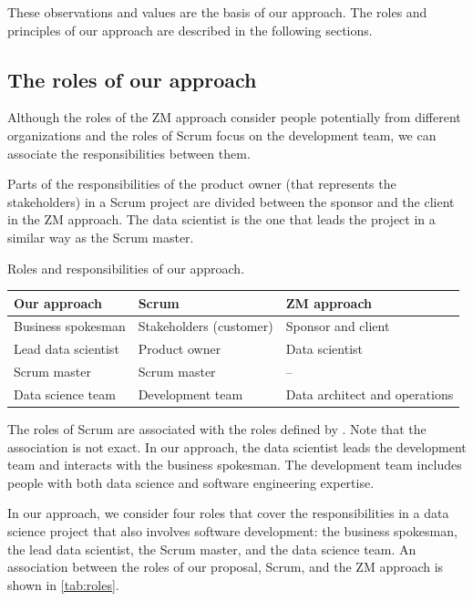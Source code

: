 These observations and values are the basis of our approach.  The roles and principles of
our approach are described in the following sections.

\subsection{The roles of our approach}

Although the roles of the ZM approach consider people potentially from different
organizations and the roles of Scrum focus on the development team, we can associate the
responsibilities between them.

Parts of the responsibilities of the product owner (that represents the stakeholders) in a
Scrum project are divided between the sponsor and the client in the ZM approach.  The data
scientist is the one that leads the project in a similar way as the Scrum master.

\begin{tablebox}[label=tab:roles]{Roles and responsibilities of our approach.}
  \centering
  \begin{tabular}{>{\raggedright\arraybackslash}p{2.5cm}>{\raggedright\arraybackslash}p{2.5cm}>{\raggedright\arraybackslash}p{2.5cm}}
    \toprule
    \textbf{Our approach} & \textbf{Scrum} & \textbf{ZM approach} \\
    \midrule
    Business spokesman    & Stakeholders (customer) & Sponsor and client \\
    Lead data scientist   & Product owner           & Data scientist \\
    Scrum master          & Scrum master            & -- \\
    Data science team     & Development team        & Data architect and operations \\
    \bottomrule
  \end{tabular}
  \tcblower
  The roles of Scrum are associated with the roles defined by \textcite{Zumel2019}.
  Note that the association is not exact.
  In our approach, the data scientist leads the development team and interacts with the
  business spokesman.  The development team includes people with both data science and software
  engineering expertise.
\end{tablebox}

In our approach, we consider four roles that cover the responsibilities in a data science
project that also involves software development: the business spokesman, the lead data
scientist, the Scrum master, and the data science team.  An association between the roles of
our proposal, Scrum, and the ZM approach is shown in \cref{tab:roles}.

